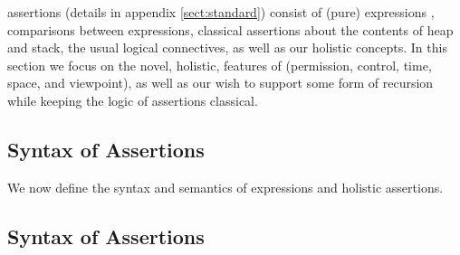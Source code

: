 
\Chainmail assertions (details in appendix \ref{sect:standard}) consist of (pure) expressions \e, comparisons between expressions, classical
assertions about the contents of heap and stack, the usual logical
connectives, as well as our holistic concepts.
In this section we focus on the novel,
 holistic, features of \Chainmail (permission, control, time, space, and viewpoint),
as well as our wish to support some form of recursion while keeping the logic of assertions classical.

\subsection{Syntax of Assertions}
 
We now define the syntax and semantics of expressions and holistic assertions.

 \subsection{Syntax of Assertions}
 


